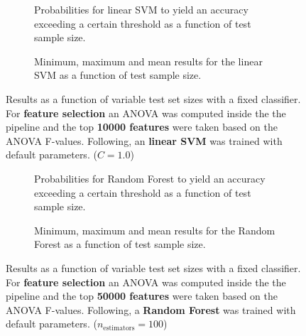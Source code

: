 \begin{figure}
    \captionsetup[subfigure]{justification=justified,singlelinecheck=false}
    \begin{subfigure}[t]{0.61\textwidth}
        
        \caption{Probabilities for linear SVM to yield an accuracy exceeding a certain threshold as a function of test sample size.}
    \end{subfigure}
    \hspace{3.0mm}
    \begin{subfigure}[t]{0.34\textwidth}
        
        \caption{Minimum, maximum and mean results for the linear SVM as a function of test sample size.}
    \end{subfigure}
    \caption[Effects of varying test sample size. Linear SVM; Preprocessing: ANOVA feature selection ($k_\text{best} = \num{10000}$)]{Results as a function of variable test set sizes with a fixed classifier. For \textbf{feature selection} an ANOVA was computed inside the the pipeline and the top \textbf{\num{10000} features} were taken based on the ANOVA F-values. Following, an \textbf{{linear SVM}} was trained with default parameters. ($C=\num{1.0}$)}
    \label{fig:no_PCA_10000_best_selected_LinearSVC}
\end{figure}

\begin{figure}
    \captionsetup[subfigure]{justification=justified,singlelinecheck=false}
    \begin{subfigure}[t]{0.61\textwidth}
        
        \caption{Probabilities for Random Forest to yield an accuracy exceeding a certain threshold as a function of test sample size.}
    \end{subfigure}
    \hspace{3.0mm}
    \begin{subfigure}[t]{0.34\textwidth}
        
        \caption{Minimum, maximum and mean results for the Random Forest as a function of test sample size.}
    \end{subfigure}
    \caption[Effects of varying test sample size. Random Forest; Preprocessing: ANOVA feature selection ($k_\text{best} = \num{50000}$)]{Results as a function of variable test set sizes with a fixed classifier. For \textbf{feature selection} an ANOVA was computed inside the the pipeline and the top \textbf{\num{50000} features} were taken based on the ANOVA F-values. Following, a \textbf{{Random Forest}} was trained with default parameters. ($n_\text{estimators}=\num{100}$)}
    \label{fig:no_PCA_50000_best_selected_RandomForest}
\end{figure}

